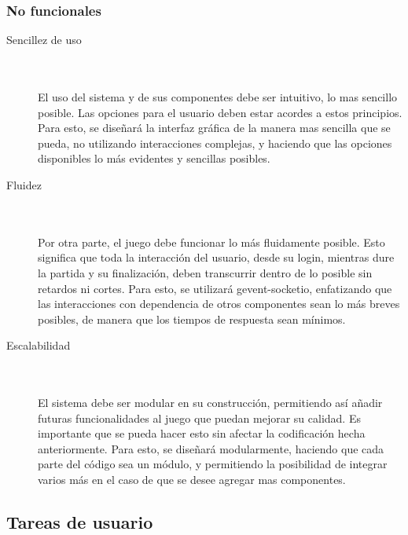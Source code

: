 \documentclass[a4paper,11pt]{article}
\begin{document}
\subsubsection{No funcionales}

\begin{description}
	\item[Sencillez de uso] \hfill \\ \\
	El uso del sistema y de sus componentes debe ser intuitivo, lo mas 
	sencillo posible. Las opciones para el usuario deben estar acordes
	a estos principios.
	Para esto, se diseñará la interfaz gráfica de la manera mas sencilla
	que se pueda, no utilizando interacciones complejas, y haciendo
	que las opciones disponibles lo más evidentes y sencillas posibles. 
	\item[Fluidez] \hfill \\ \\
	Por otra parte, el juego debe funcionar lo más fluidamente posible.
	Esto significa que toda la interacción del usuario, desde su login, 
	mientras dure la partida y su finalización, deben transcurrir dentro 
	de lo posible sin retardos ni cortes.
	Para esto, se utilizará gevent-socketio, enfatizando que las 
	interacciones con dependencia de otros componentes
	sean lo más breves posibles, de manera que los tiempos de respuesta
	sean mínimos. 
	\item[Escalabilidad] \hfill \\ \\
	El sistema debe ser modular en su construcción, permitiendo así 
	añadir futuras funcionalidades al juego que puedan mejorar su
	calidad. Es importante que se pueda hacer esto sin afectar la 
	codificación hecha anteriormente.
	Para esto, se diseñará modularmente, haciendo que cada parte del código
	sea un módulo, y permitiendo la posibilidad de integrar varios más
	en el caso de que se desee agregar mas componentes.

\end{description}
\newpage

\subsection{Tareas de usuario}
\end{document}
